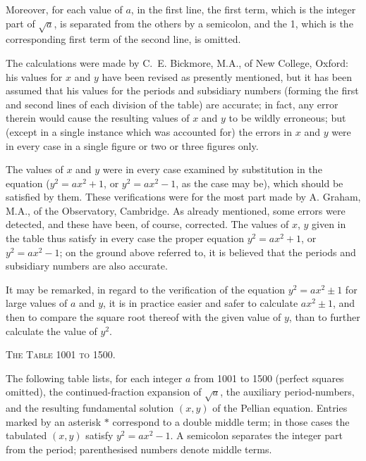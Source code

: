 \documentclass[11pt]{article}
\providecommand{\asterism}{*}
\begin{document}
Moreover, for each value of $a$, in the first line, the first term, which is the integer part of $\sqrt{a}$, is separated from the others by a semicolon, and the 1, which is the corresponding first term of the second line, is omitted.

The calculations were made by C.~E. Bickmore, M.A., of New College, Oxford: his values for $x$ and $y$ have been revised as presently mentioned, but it has been assumed that his values for the periods and subsidiary numbers (forming the first and second lines of each division of the table) are accurate; in fact, any error therein would cause the resulting values of $x$ and $y$ to be wildly erroneous; but (except in a single instance which was accounted for) the errors in $x$ and $y$ were in every case in a single figure or two or three figures only.

The values of $x$ and $y$ were in every case examined by substitution in the equation ($y^2 = ax^2 + 1$, or $y^2 = ax^2 - 1$, as the case may be), which should be satisfied by them. These verifications were for the most part made by A. Graham, M.A., of the Observatory, Cambridge. As already mentioned, some errors were detected, and these have been, of course, corrected. The values of $x$, $y$ given in the table thus satisfy in every case the proper equation $y^2 = ax^2 + 1$, or $y^2 = ax^2 - 1$; on the ground above referred to, it is believed that the periods and subsidiary numbers are also accurate.

It may be remarked, in regard to the verification of the equation $y^2 = ax^2 \pm 1$ for large values of $a$ and $y$, it is in practice easier and safer to calculate $ax^2 \pm 1$, and then to compare the square root thereof with the given value of $y$, than to further calculate the value of $y^2$.

\begin{center}
\small\textsc{The Table 1001 to 1500.}
\end{center}

\noindent The following table lists, for each integer $a$ from 1001 to 1500 (perfect squares omitted), the continued-fraction expansion of $\sqrt{a}$, the auxiliary period-numbers, and the resulting fundamental solution $(x,y)$ of the Pellian equation. Entries marked by an asterisk $\asterism$ correspond to a double middle term; in those cases the tabulated $(x,y)$ satisfy $y^2 = ax^2 - 1$. A semicolon separates the integer part from the period; parenthesised numbers denote middle terms.
\end{document}
